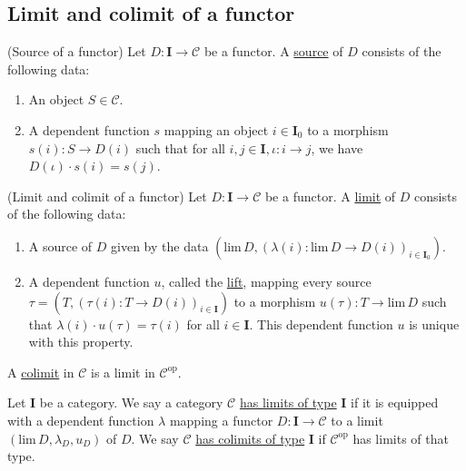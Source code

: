 
\subsection{Limit and colimit of a functor}

\begin{definition}{(Source of a functor)}
Let $D : \mathbf{I} \rightarrow \mathcal{C}$ be a functor. A \ul{source} of $D$ consists of the following data:
\begin{enumerate}
\renewcommand{\labelenumi}{(\theenumi)}
\item An object $S \in \mathcal{C}$.
\item A dependent function $s$ mapping an object $i \in \mathbf{I}_{0}$ to a morphism
$s(i) : S \rightarrow D(i)$ such that for all $i, j \in \mathbf{I}, \iota : i \rightarrow j$, we have $D(\iota) \cdot s(i) = s(j)$.
\end{enumerate}
\end{definition}

\begin{definition}{(Limit and colimit of a functor)}\label{def:limit}
Let $D : \mathbf{I} \rightarrow \mathcal{C}$ be a functor. A \ul{limit} of $D$ consists of the
following data:
\begin{enumerate}
\renewcommand{\labelenumi}{(\theenumi)}
\item A source of $D$ given by the data $(\mathrm{lim}\, D, (\lambda(i) : \mathrm{lim}\, D \rightarrow D(i))_{i\in\mathbf{I}_{0}})$.
\item A dependent function $u$, called the \ul{lift}, mapping every source $\tau = (T, (\tau(i) : T \rightarrow D(i))_{i \in \mathbf{I}})$ to a
morphism $u(\tau) : T \rightarrow \mathrm{lim}\, D$ such that $\lambda(i) \cdot u(\tau) = \tau(i)$ for all $i \in \mathbf{I}$.
This dependent function $u$ is unique with this property.
\end{enumerate}
A \ul{colimit} in $\mathcal{C}$ is a limit in $\mathcal{C}^{\mathrm{op}}$.
\end{definition}

\begin{definition}
Let $\mathbf{I}$ be a category. We say a category $\mathcal{C}$ \ul{has limits of type} $\mathbf{I}$ if it is
equipped with a dependent function $\lambda$ mapping a functor $D : \mathbf{I} \rightarrow \mathcal{C}$ to a limit
$(\mathrm{lim}\, D, \lambda_{D}, u_{D})$ of $D$.
We say $\mathcal{C}$ \ul{has colimits of type} $\mathbf{I}$ if $\mathcal{C}^{\mathrm{op}}$ has limits of that type.
\end{definition}

